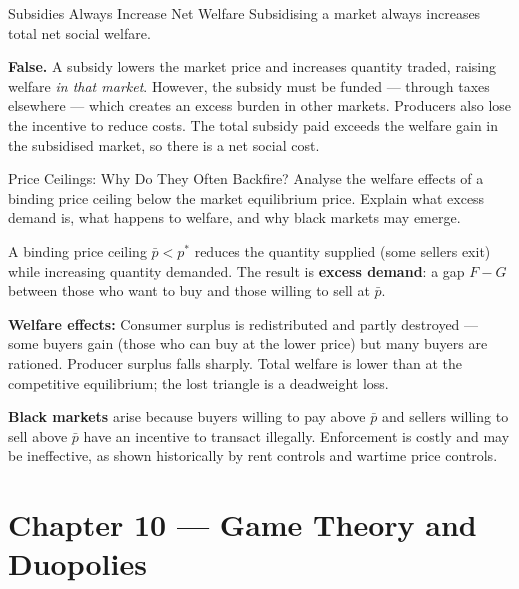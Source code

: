 \documentclass[paper=a5]{scrartcl}
\begin{document}
\begin{question}[type=tf]{Subsidies Always Increase Net Welfare}
Subsidising a market always increases total net social welfare.
\truefalse[false]
\begin{solution}
  \textbf{False.} A subsidy lowers the market price and increases quantity
  traded, raising welfare \emph{in that market}. However, the subsidy must be
  funded — through taxes elsewhere — which creates an excess burden in other
  markets. Producers also lose the incentive to reduce costs. The total
  subsidy paid exceeds the welfare gain in the subsidised market, so there is
  a net social cost.
\end{solution}
\end{question}

\begin{question}[type=open]{Price Ceilings: Why Do They Often Backfire?}
Analyse the welfare effects of a binding price ceiling below the market
equilibrium price. Explain what excess demand is, what happens to welfare,
and why black markets may emerge.

\answerlines[7]

\begin{solution}
  A binding price ceiling $\bar{p} < p^*$ reduces the quantity supplied (some
  sellers exit) while increasing quantity demanded. The result is
  \textbf{excess demand}: a gap $F-G$ between those who want to buy and those
  willing to sell at $\bar{p}$.

  \textbf{Welfare effects:} Consumer surplus is redistributed and partly
  destroyed — some buyers gain (those who can buy at the lower price) but many
  buyers are rationed. Producer surplus falls sharply. Total welfare is lower
  than at the competitive equilibrium; the lost triangle is a deadweight loss.

  \textbf{Black markets} arise because buyers willing to pay above $\bar{p}$
  and sellers willing to sell above $\bar{p}$ have an incentive to transact
  illegally. Enforcement is costly and may be ineffective, as shown
  historically by rent controls and wartime price controls.
\end{solution}
\end{question}


\section{Chapter 10 — Game Theory and Duopolies}
\end{document}
